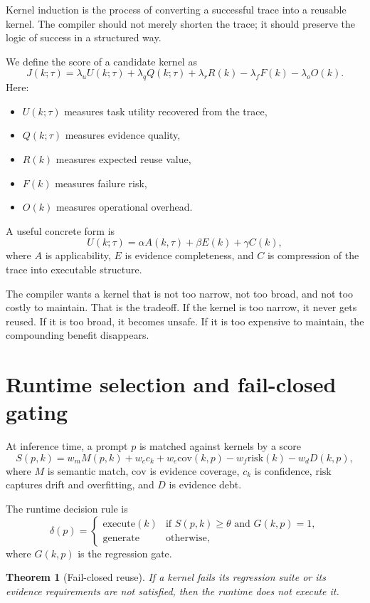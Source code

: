 \documentclass{article}
\newtheorem{theorem}{Theorem}
\begin{document}
Kernel induction is the process of converting a successful trace into a reusable kernel. The compiler should not merely shorten the trace; it should preserve the logic of success in a structured way.

We define the score of a candidate kernel as
\[
J(k;\tau)=\lambda_u U(k;\tau)+\lambda_q Q(k;\tau)+\lambda_r R(k)-\lambda_f F(k)-\lambda_o O(k).
\]
Here:
\begin{itemize}[leftmargin=1.2em]
\item $U(k;\tau)$ measures task utility recovered from the trace,
\item $Q(k;\tau)$ measures evidence quality,
\item $R(k)$ measures expected reuse value,
\item $F(k)$ measures failure risk,
\item $O(k)$ measures operational overhead.
\end{itemize}

A useful concrete form is
\[
U(k;\tau)=\alpha A(k,\tau)+\beta E(k)+\gamma C(k),
\]
where $A$ is applicability, $E$ is evidence completeness, and $C$ is compression of the trace into executable structure.

The compiler wants a kernel that is not too narrow, not too broad, and not too costly to maintain. That is the tradeoff. If the kernel is too narrow, it never gets reused. If it is too broad, it becomes unsafe. If it is too expensive to maintain, the compounding benefit disappears.

\section{Runtime selection and fail-closed gating}

At inference time, a prompt $p$ is matched against kernels by a score
\[
S(p,k)=w_m M(p,k)+w_c c_k+w_e \mathrm{cov}(k,p)-w_f \mathrm{risk}(k)-w_d D(k,p),
\]
where $M$ is semantic match, $\mathrm{cov}$ is evidence coverage, $c_k$ is confidence, $\mathrm{risk}$ captures drift and overfitting, and $D$ is evidence debt.

The runtime decision rule is
\[
\delta(p)=\begin{cases}
\text{execute}(k) & \text{if } S(p,k)\ge \theta \text{ and } G(k,p)=1,\\
\text{generate} & \text{otherwise},
\end{cases}
\]
where $G(k,p)$ is the regression gate.

\begin{theorem}[Fail-closed reuse]
If a kernel fails its regression suite or its evidence requirements are not satisfied, then the runtime does not execute it.
\end{theorem}
\end{document}
